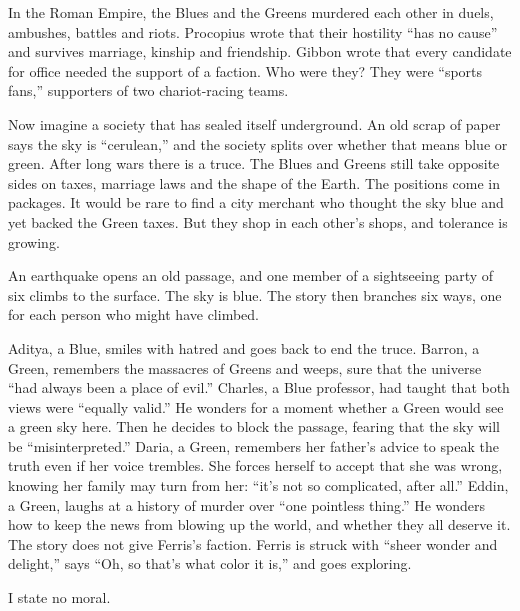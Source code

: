 
In the Roman Empire, the Blues and the Greens murdered each other in duels, ambushes, battles and riots. Procopius wrote that their hostility ``has no cause'' and survives marriage, kinship and friendship. Gibbon wrote that every candidate for office needed the support of a faction. Who were they? They were ``sports fans,'' supporters of two chariot-racing teams. 

Now imagine a society that has sealed itself underground. An old scrap of paper says the sky is ``cerulean,'' and the society splits over whether that means blue or green. After long wars there is a truce. The Blues and Greens still take opposite sides on taxes, marriage laws and the shape of the Earth. The positions come in packages. It would be rare to find a city merchant who thought the sky blue and yet backed the Green taxes. But they shop in each other's shops, and tolerance is growing. 

An earthquake opens an old passage, and one member of a sightseeing party of six climbs to the surface. The sky is blue. The story then branches six ways, one for each person who might have climbed.

Aditya, a Blue, smiles with hatred and goes back to end the truce. Barron, a Green, remembers the massacres of Greens and weeps, sure that the universe ``had always been a place of evil.'' Charles, a Blue professor, had taught that both views were ``equally valid.'' He wonders for a moment whether a Green would see a green sky here. Then he decides to block the passage, fearing that the sky will be ``misinterpreted.''  Daria, a Green, remembers her father's advice to speak the truth even if her voice trembles. She forces herself to accept that she was wrong, knowing her family may turn from her: ``it's not so complicated, after all.'' Eddin, a Green, laughs at a history of murder over ``one pointless thing.'' He wonders how to keep the news from blowing up the world, and whether they all deserve it. The story does not give Ferris's faction. Ferris is struck with ``sheer wonder and delight,'' says ``Oh, so that's what color it is,'' and goes exploring.

I state no moral. 
